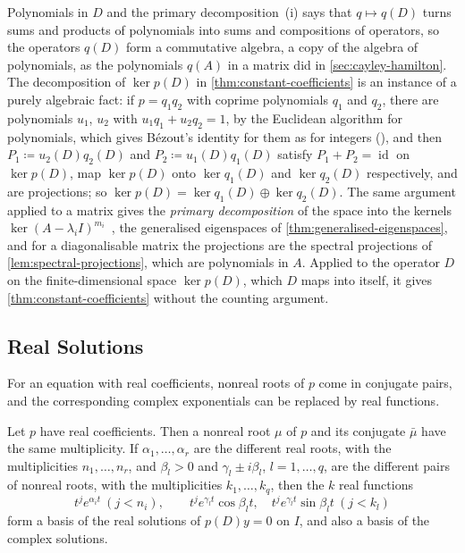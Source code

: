 \begin{note}{Polynomials in $D$ and the primary decomposition}
\,(i) says that $q\mapsto q(D)$ turns sums and products of polynomials into sums and compositions of operators, so the operators $q(D)$ form a commutative algebra, a copy of the algebra of polynomials, as the polynomials $q(A)$ in a matrix did in \cref{sec:cayley-hamilton}. The decomposition of $\ker p(D)$ in \cref{thm:constant-coefficients} is an instance of a purely algebraic fact: if $p=q_1q_2$ with coprime polynomials $q_1$ and $q_2$, there are polynomials $u_1$, $u_2$ with $u_1q_1+u_2q_2=1$, by the Euclidean algorithm for polynomials, which gives B\'ezout's identity for them as for integers (), and then $P_1\coloneqq u_2(D)q_2(D)$ and $P_2\coloneqq u_1(D)q_1(D)$ satisfy $P_1+P_2=\operatorname{id}$ on $\ker p(D)$, map $\ker p(D)$ onto $\ker q_1(D)$ and $\ker q_2(D)$ respectively, and are projections; so $\ker p(D)=\ker q_1(D)\oplus\ker q_2(D)$. The same argument applied to a matrix gives the \emph{primary decomposition} of the space into the kernels $\ker(A-\lambda_iI)^{m_i}$~\cite[Chap.~6]{hoffman1971}, the generalised eigenspaces of \cref{thm:generalised-eigenspaces}, and for a diagonalisable matrix the projections are the spectral projections of \cref{lem:spectral-projections}, which are polynomials in $A$. Applied to the operator $D$ on the finite-dimensional space $\ker p(D)$, which $D$ maps into itself, it gives \cref{thm:constant-coefficients} without the counting argument.
\end{note}

\subsection{Real Solutions}

For an equation with real coefficients, nonreal roots of $p$ come in conjugate pairs, and the corresponding complex exponentials can be replaced by real functions.

\begin{corollary}
\label{cor:real-fundamental}
Let $p$ have real coefficients. Then a nonreal root $\mu$ of $p$ and its conjugate $\bar\mu$ have the same multiplicity. If $\alpha_1,\ldots,\alpha_r$ are the different real roots, with the multiplicities $n_1,\ldots,n_r$, and $\beta_l>0$ and $\gamma_l\pm i\beta_l$, $l=1,\ldots,q$, are the different pairs of nonreal roots, with the multiplicities $k_1,\ldots,k_q$, then the $k$ real functions
\[
t^je^{\alpha_it}\ (j<n_i),\qquad t^je^{\gamma_lt}\cos\beta_lt,\quad t^je^{\gamma_lt}\sin\beta_lt\ (j<k_l)
\]
form a basis of the real solutions of $p(D)y=0$ on $I$, and also a basis of the complex solutions.
\end{corollary}


